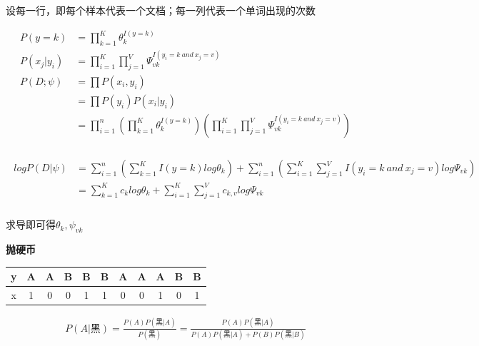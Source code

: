 \documentclass[UTF8]{ctexart}
\numberwithin{equation}{section}
\begin{document}
设每一行，即每个样本代表一个文档；每一列代表一个单词出现的次数

\begin{equation*}
    \begin{aligned}
        P(y=k)&=\prod^{K}_{k=1}\theta_k^{I(y=k)}\\
        P(x_j|y_i)&=\prod^{K}_{i=1}\prod^{V}_{j=1}\Psi_{vk}^{I(y_i=k ~and~x_j=v )}\\
        P(D;\psi)&=\prod P(x_i,y_i)\\
        &= \prod P(y_i)P(x_i|y_i)\\
        &= \prod_{i=1}^n(\prod^{K}_{k=1}\theta_k^{I(y=k)})(\prod^{K}_{i=1}\prod^{V}_{j=1}\Psi_{vk}^{I(y_i=k ~and~x_j=v )})\\
    \end{aligned}    
\end{equation*}


\begin{gather*}
        \begin{aligned}
        logP(D|\psi)&= \sum_{i=1}^n(\sum^{K}_{k=1}{I(y=k)}log\theta_k^{})+\sum_{i=1}^n(\sum^{K}_{i=1}\sum^{V}_{j=1}{I(y_i=k ~and~x_j=v )}log\Psi_{vk})\\
        &=\sum^{K}_{k=1}{c_k}log\theta_k^{}+\sum^{K}_{i=1}\sum^{V}_{j=1}{c_{k,v}}log\Psi_{vk}\\
        \end{aligned}
\end{gather*}


求导即可得$\theta_k,\psi_{vk}$


\dotfill

\textbf{抛硬币}
\begin{table}[htbp]
    \centering
    \begin{tabular}{c|c c c c c c c c c c }
         y & A & A & B & B & B & A & A & A & B & B  \\
         \hline
         x & 1 & 0 & 0 & 1 & 1 & 0 & 0 & 1 & 0 & 1 
    \end{tabular}
    \label{tab:coin}
\end{table}


$$
\begin{aligned}
P(A|黑)=\frac{P(A)P(黑|A)}{P(黑)}=\frac{P(A)P(黑|A)}{P(A)P(黑|A)+P(B)P(黑|B)}
\end{aligned}
$$
\end{document}
